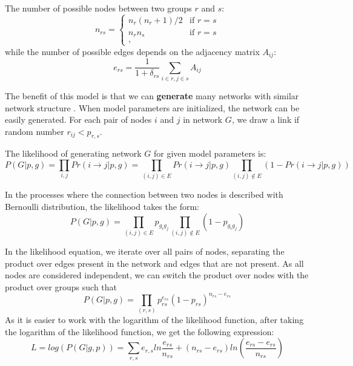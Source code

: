The number of possible nodes between two groups $r$ and $s$:
\begin{equation}
n_{rs} = \begin{cases}
n_r(n_{r}+1)/2 &\text{if  } r=s \\
n_rn_s &\text{if  } r=s\\, 
\end{cases}
\end{equation}
while the number of possible edges depends on the adjacency matrix $A_{ij}$:
\begin{equation}
e_{rs}=\frac{1}{1+\delta_{rs}}\sum_{i \in r, j\in s} A_{ij}
\end{equation}



The benefit of this model is that we can \textbf{generate} many networks with similar network structure \cite{rosvall2019different}. When model parameters are initialized, the network can be easily generated. For each pair of nodes $i$ and $j$ in network $G$, we draw a link if random number $r_{ij}<p_{r, s}$. 

The likelihood of generating network $G$ for given model parameters is:
\begin{equation}
P(G|p, g) = \prod_{i,j} Pr(i \rightarrow j| p, g) = \prod_{(i,j)\in E} Pr(i \rightarrow j| p, g)\prod_{(i,j)\notin E} ( 1 - Pr(i \rightarrow j| p, g))
\end{equation}

In the processes where the connection between two nodes is described with Bernoulli distribution, the likelihood takes the form:
\begin{equation}
P(G|p, g) = \prod_{(i,j)\in E} p_{g_ig_j}\prod_{(i,j)\notin E} ( 1 - p_{g_ig_j})
\end{equation}

In the likelihood equation, we iterate over all pairs of nodes, separating the product over edges present in the network and edges that are not present.  
As all nodes are considered independent, we can switch the product over nodes with the product over groups such that
\begin{equation}
P(G|p, g) = \prod_{(r,s)} p_{rs}^{e_{rs}}(1-p_{rs})^{n_{rs}-e_{rs}}
\end{equation}
As it is easier to work with the logarithm of the likelihood function, after taking the logarithm of the likelihood function, we get the following expression:
\begin{equation}
L = log(P(G|g, p)) = \sum_{r,s} e_{r,s} ln\frac{e_{rs}}{n_{rs}} + (n_{rs}-e_{rs})ln(\frac{e_{rs}-e_{rs}}{n_{rs}})
\end{equation}

